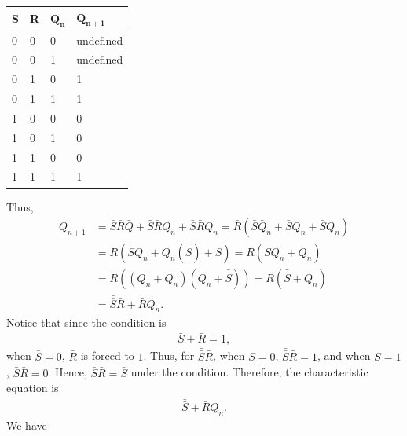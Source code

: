 \documentclass{report}
\begin{document}
\begin{itemize}
\begin{center}
\begin{tabularx}{\textwidth}{@{}XXXX@{}}
                    \textbf{S} & \textbf{R} & $\mathbf{Q_{n}}$ & $\mathbf{Q_{n+1}}$ \\
                    \midrule
                    0 & 0 & 0& undefined \\[2ex]
                    0 & 0 & 1& undefined \\[2ex]
                    0 & 1 & 0& 1\\[2ex]
                    0 & 1 & 1& 1\\[2ex]
                    1 & 0 & 0& 0\\[2ex]
                    1 & 0 & 1& 0\\[2ex]
                    1 & 1 & 0& 0\\[2ex]
                    1 & 1 & 1& 1\\
                    \bottomrule
                \end{tabularx}
            \end{center}
            Thus, 
            \begin{align*}
                Q_{n+1} &= \bar{\bar{S}}\bar{R}\bar{Q} + \bar{\bar{S}}\bar{R}Q_{n} + \bar{S}\bar{R}Q_{n} = \bar{R}(\bar{\bar{S}}\bar{Q}_{n} + \bar{\bar{S}}Q_{n} + \bar{S}Q_{n}) \\
                &=\bar{R}(\bar{\bar{S}}\bar{Q}_{n} + Q_{n}(\bar{\bar{S}}) + \bar{S})  = \bar{R}(\bar{\bar{S}}\bar{Q}_{n} + Q_{n}) \\
                &=\bar{R}((Q_{n} + \bar{Q}_{n})(Q_{n} + \bar{\bar{S}})) = \bar{R}(\bar{\bar{S}} + Q_{n}) \\
                &=\bar{\bar{S}}\bar{R} + \bar{R}Q_{n}
            .\end{align*}
            Notice that since the condition is 
            \begin{align*}
                \bar{S} + \bar{R} = 1
            ,\end{align*}
            when $\bar{S} = 0$, $\bar{R}$ is forced to $1$. Thus, for $\bar{\bar{S}}\bar{R}$, when $S = 0$, $\bar{\bar{S}}\bar{R} = 1$, and when $S = 1$, $\bar{\bar{S}}\bar{R} = 0$. Hence, $\bar{\bar{S}}\bar{R} = \bar{\bar{S}} $ under the condition.
            \bigbreak \noindent 
            Therefore, the characteristic equation is 
            \begin{align*}
                \bar{\bar{S}} + \bar{R}Q_{n}
            .\end{align*}
            We have
            \begin{center}
                \begin{tabularx}{\textwidth}{@{}XXX@{}}

\end{tabularx}
\end{center}
\end{itemize}
\end{document}
